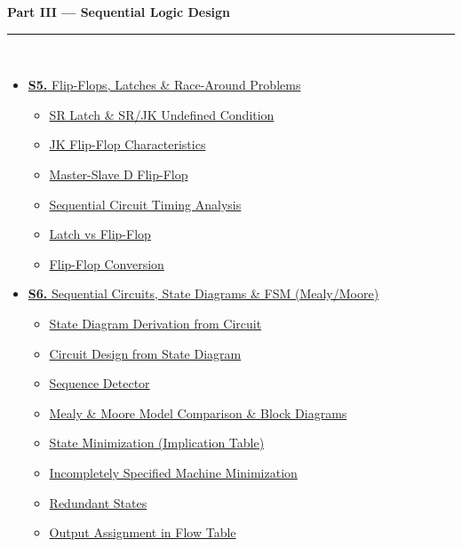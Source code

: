 \documentclass[12pt]{article}
\begin{document}
\begin{tcolorbox}[breakable,colback=cC!5,colframe=cC,boxrule=1pt,arc=5pt,
  left=8pt,right=8pt,top=8pt,bottom=8pt,before skip=4pt]
  {\large\bfseries\textcolor{cC}{Part III --- Sequential Logic Design}}\\[5pt]
  \textcolor{cC!40}{\rule{\textwidth}{0.4pt}}\\[3pt]
  \small\begin{itemize}[leftmargin=1.2em,itemsep=1pt,label={\textcolor{cC}{$\triangleright$}}]
    \item \hyperref[sec:S5]{\textbf{S5.} Flip-Flops, Latches \& Race-Around Problems}
      \begin{itemize}[leftmargin=1.5em,itemsep=0pt,label={\textcolor{cC}{$\cdot$}}]
        \item \hyperref[sub:s5-sr]{SR Latch \& SR/JK Undefined Condition}
        \item \hyperref[sub:s5-jk]{JK Flip-Flop Characteristics}
        \item \hyperref[sub:s5-master-slave]{Master-Slave D Flip-Flop}
        \item \hyperref[sub:s5-timing]{Sequential Circuit Timing Analysis}
        \item \hyperref[sub:s5-latch-ff]{Latch vs Flip-Flop}
        \item \hyperref[sub:s5-conversion]{Flip-Flop Conversion}
      \end{itemize}
    \item \hyperref[sec:S6]{\textbf{S6.} Sequential Circuits, State Diagrams \& FSM (Mealy/Moore)}
      \begin{itemize}[leftmargin=1.5em,itemsep=0pt,label={\textcolor{cC}{$\cdot$}}]
        \item \hyperref[sub:s6-state-derivation]{State Diagram Derivation from Circuit}
        \item \hyperref[sub:s6-circuit-design]{Circuit Design from State Diagram}
        \item \hyperref[sub:s6-sequence]{Sequence Detector}
        \item \hyperref[sub:s6-mealy-moore]{Mealy \& Moore Model Comparison \& Block Diagrams}
        \item \hyperref[sub:s6-state-min]{State Minimization (Implication Table)}
        \item \hyperref[sub:s6-incomp]{Incompletely Specified Machine Minimization}
        \item \hyperref[sub:s6-redundant]{Redundant States}
        \item \hyperref[sub:s6-output-assign]{Output Assignment in Flow Table}

\end{itemize}
\end{itemize}
\end{tcolorbox}
\end{document}
